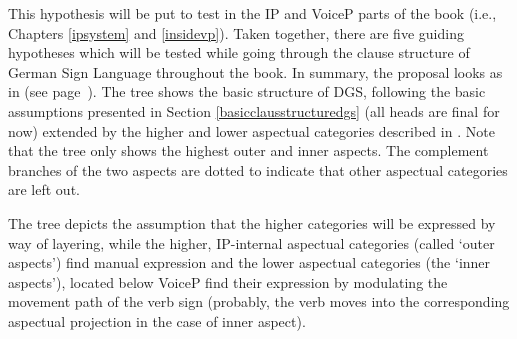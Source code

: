 \noindent This hypothesis will be put to test in the IP and VoiceP parts of the book (i.e., Chapters \ref{ipsystem} and \ref{insidevp}). Taken together, there are five guiding hypotheses which will be tested while going through the clause structure of German Sign Language throughout the book. In summary, the proposal looks as in  (see page~\pageref{treeovervies}). The tree shows the basic structure of DGS, following the basic assumptions presented in Section \ref{basicclausstructuredgs} (all heads are final for now) extended by the higher and lower aspectual categories described in \citet{cinque1999adverbs, cinque2006restructuring}. Note that the tree only shows the highest outer and inner aspects. The complement branches of the two aspects are dotted to indicate that other aspectual categories are left out.




The tree depicts the assumption that the higher categories will be expressed by way of layering, while the higher, IP-internal aspectual categories (called `outer aspects') find manual expression and the lower aspectual categories (the `inner aspects'), located below VoiceP find their expression by modulating the movement path of the verb sign (probably, the verb moves into the corresponding aspectual projection in the case of inner aspect). 

